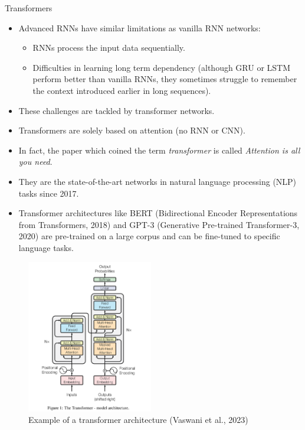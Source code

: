 \begin{vbframe}{Transformers}
  \begin{itemize}
    \item Advanced RNNs have similar limitations as vanilla RNN networks:
    \begin{itemize}
      \item RNNs process the input data sequentially.
     \item Difficulties in learning long term dependency (although GRU or LSTM perform better than vanilla RNNs, they sometimes struggle to remember the context introduced earlier in long sequences).
    \end{itemize}
    \item These challenges are tackled by transformer networks.
    
    \framebreak
    
    \item Transformers are solely based on attention (no RNN or CNN).
    \item In fact, the paper which coined the term \textit{transformer} is called \textit{Attention is all you need}.
    \item They are the state-of-the-art networks in natural language processing (NLP) tasks since 2017.
    \item Transformer architectures like BERT (Bidirectional Encoder Representations from Transformers, 2018) and GPT-3 (Generative Pre-trained Transformer-3, 2020) are pre-trained on a large corpus and can be fine-tuned to specific language tasks.
  \end{itemize}

\framebreak

\begin{figure}
\begin{center}
\includegraphics[width=5.5cm]{plots/transformer.png}
\caption{Example of a transformer architecture (Vaswani et al., 2023)}
\end{center}
\end{figure}

\end{vbframe}


